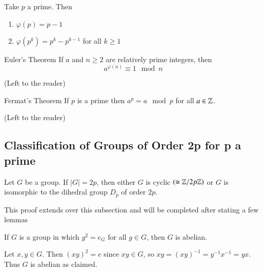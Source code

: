 \documentclass[12pt, a4paper, twoside, openright, titlepage]{book}
\begin{document}
\begin{eg}{}{}
        Take $p$ a prime. Then \begin{enumerate}
                \item $\varphi(p) = p-1$
                \item $\varphi(p^k) = p^k - p^{k-1}$ for all $k \geq 1$
        \end{enumerate}
\end{eg}


\begin{namthm}{Euler's Theorem}{}
        If $a$ and $n \geq 2$ are relatively prime integers, then \begin{equation}
                a^{\varphi(n)} \equiv 1 \mod n
        \end{equation}
\end{namthm}
\begin{proof*}{}{}
        (Left to the reader)
\end{proof*}

\begin{namthm}{Fermat's Theorem}{}
        If $p$ is a prime then $a^p = a \mod p$ for all $a \in \mathbb Z$.
\end{namthm}
\begin{proof*}{}{}
        (Left to the reader)
\end{proof*}

\subsection{\textsection Classification of Groups of Order 2p for p a prime}

\begin{thm}{}{}
        Let $G$ be a group. If $|G| = 2p$, then either $G$ is cyclic $(\cong \mathbb Z/2p\mathbb Z)$ or $G$ is isomorphic to the dihedral group $D_p$ of order $2p$.
\end{thm}
\begin{proof*}{}{}
        This proof extends over this subsection and will be completed after stating a few lemmas
\end{proof*}


\begin{lem}{}{}
        If $G$ is a group in which $g^2 = e_G$ for all $g \in G$, then $G$ is abelian.
\end{lem}
\begin{proof*}{}{}
        Let $x,y \in G$. Then $(xy)^2 = e$ since $xy \in G$, so $xy = (xy)^{-1} = y^{-1}x^{-1} = yx$. Thus $G$ is abelian as claimed.
\end{proof*}
\end{document}
